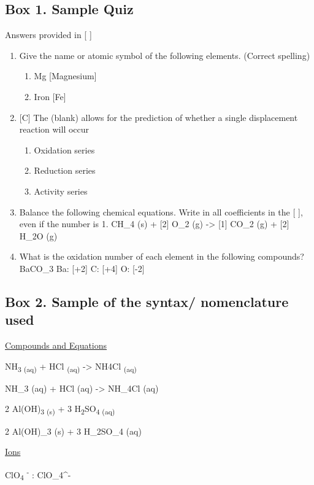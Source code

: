 \documentclass[11.5pt]{sig-alternate} %
\begin{document}
\begin{large}
\subsection*{Box 1. Sample Quiz}
Answers provided in [ ]
\begin{enumerate}
    \item  Give the name or atomic symbol of the following elements. (Correct spelling)
 \begin{enumerate}[label=\alph*.]
       \item  Mg [Magnesium]
    \item Iron [Fe]
 \end{enumerate}
    \item{} [C] The (blank) allows for the prediction of whether a single displacement reaction will occur
   \begin{enumerate}[label=\alph*.]
        \item  Oxidation series 
        \item  Reduction series  
        \item Activity series
   \end{enumerate}
    \item Balance the following chemical equations.  Write in all coefficients in the [ ], even if the number is 1. \newline 
    [1] CH\_4 (s) + [2] O\_2 (g) -> [1] CO\_2 (g) + [2] H\_2O (g)
    \item  What is the oxidation number of each element in the following compounds? \newline
     BaCO\_3 \newline
     Ba: [+2]  C: [+4]  O: [-2]
\end{enumerate}

\subsection*{Box 2. Sample of the syntax/ nomenclature used}

\underline{Compounds and Equations}

NH\textsubscript{3 (aq)} + HCl \textsubscript{(aq)} -> NH4Cl \textsubscript{(aq)}

NH\_3 (aq) + HCl (aq) -> NH\_4Cl (aq)

2 Al(OH)\textsubscript{3 (s)} + 3 H\textsubscript{2}SO\textsubscript{4 (aq)}

2 Al(OH)\_3 (s) + 3 H\_2SO\_4 (aq) 

\underline{Ions}

ClO\textsubscript{4} \textsuperscript{-} : ClO\_4\^{}-


\end{large}
\end{document}
